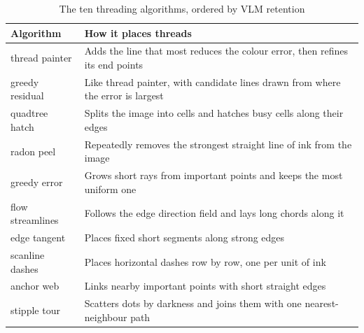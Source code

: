 \begin{table}[t]
\centering
\caption{The ten threading algorithms, ordered by VLM retention}
\label{tab:algorithms}
\footnotesize
\begin{tabular}{@{}lp{5.5cm}@{}}
\toprule
Algorithm & How it places threads \\
\midrule
thread painter & Adds the line that most reduces the colour error, then refines its end points \\
greedy residual & Like thread painter, with candidate lines drawn from where the error is largest \\
quadtree hatch & Splits the image into cells and hatches busy cells along their edges \\
radon peel & Repeatedly removes the strongest straight line of ink from the image \\
greedy error & Grows short rays from important points and keeps the most uniform one \\
flow streamlines & Follows the edge direction field and lays long chords along it \\
edge tangent & Places fixed short segments along strong edges \\
scanline dashes & Places horizontal dashes row by row, one per unit of ink \\
anchor web & Links nearby important points with short straight edges \\
stipple tour & Scatters dots by darkness and joins them with one nearest-neighbour path \\
\bottomrule
\end{tabular}
\end{table}
